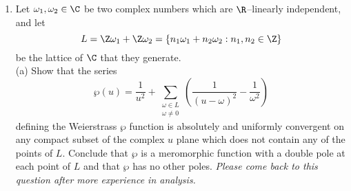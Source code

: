 \documentclass[11pt, oneside]{article}
\begin{document}
\begin{enumerate}
\item Let $\omega_1,\omega_2\in\C$ be two complex numbers which are $\R$--linearly independent, and let 
$$
L = \Z\omega_1 + \Z\omega_2 = \{n_1\omega_1 + n_2\omega_2 : n_1,n_2\in\Z\}
$$
be the lattice of $\C$ that they generate.\\
(a) Show that the series
$$
\wp (u) = \frac{1}{u^2} + \sum_{\substack{\omega\in L\\\omega\neq 0}}\left(  \frac{1}{(u-\omega)^2} - \frac{1}{\omega^2} \right)
$$
defining the Weierstrass $\wp$ function is absolutely and uniformly convergent on any compact subset of the complex $u$ plane which does not contain any of the points of $L$. Conclude that $\wp$ is a meromorphic function with a double pole at each point of $L$ and that $\wp$ has no other poles. \textit{Please come back to this question after more experience in analysis.}


\end{enumerate}
\end{document}
